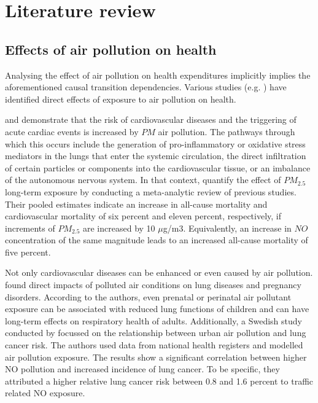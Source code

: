 \documentclass[
]{article}
\begin{document}
	\hypertarget{literature review}{%
		\section{Literature review}\label{Literature review}}
	
	\subsection{Effects of air pollution on health}
	
	Analysing the effect of air pollution on health expenditures implicitly implies the aforementioned causal transition dependencies. Various studies (e.g. \cite{franklin2015air,NYBERG2000,LEL2015}) have identified direct effects of exposure to air pollution on health. 
	
	\cite{franklin2015air} and \cite{fiordelisi2017mechanisms} demonstrate that the risk of cardiovascular diseases and the triggering of acute cardiac events is increased by $PM$ air pollution. The pathways through which this occurs include the generation of pro-inflammatory or oxidative stress mediators in the lungs that enter the systemic circulation, the direct infiltration of certain particles or components into the cardiovascular tissue, or an imbalance of the autonomous nervous system. In that context, \cite{hoek2013long} quantify the effect of $PM_2.5$ long-term exposure by conducting a meta-analytic review of previous studies. Their pooled estimates indicate an increase in all-cause mortality and cardiovascular mortality of six percent and eleven percent, respectively, if increments of $PM_2.5$ are increased by 10 $\mu$g/m3. Equivalently, an increase in $NO$ concentration of the same magnitude leads to an increased all-cause mortality of five percent.  
	
	Not only cardiovascular diseases can be enhanced or even caused by air pollution. \cite{KIM2018} found direct impacts of polluted air conditions on lung diseases and pregnancy disorders. According to the authors, even prenatal or perinatal air pollutant exposure can be associated with reduced lung functions of children and can have long-term effects on respiratory health of adults. Additionally, a Swedish study conducted by \cite{NYBERG2000} focussed on the relationship between urban air pollution and lung cancer risk. The authors used data from national health registers and modelled air pollution exposure. The results show a significant correlation between higher NO pollution and increased incidence of lung cancer. To be specific, they attributed a higher relative lung cancer risk between 0.8 and 1.6 percent to traffic related NO exposure. 
	
\end{document}
